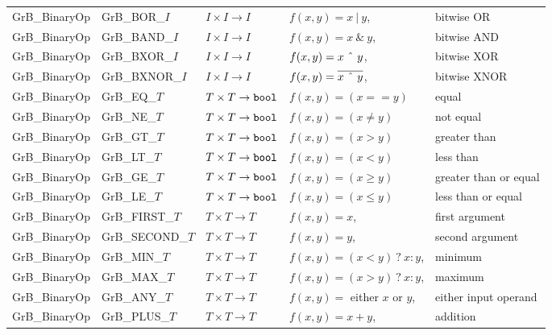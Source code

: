 \begin{table}
\begin{threeparttable}
\begin{tabular}{l|l|l|ll}
{\sf GrB\_BinaryOp}   & {\sf GrB\_BOR\_$I$}   & $I \times I \rightarrow I$ & $f(x,y) = x ~|~ y$, & bitwise OR \\
{\sf GrB\_BinaryOp}   & {\sf GrB\_BAND\_$I$}  & $I \times I \rightarrow I$ & $f(x,y) = x ~\&~ y$, & bitwise AND \\
{\sf GrB\_BinaryOp}   & {\sf GrB\_BXOR\_$I$}  & $I \times I \rightarrow I$ & $f(x,y) = x ~\mbox{\^{}}~ y$, & bitwise XOR \\
{\sf GrB\_BinaryOp}   & {\sf GrB\_BXNOR\_$I$} & $I \times I \rightarrow I$ & $f(x,y) = \overline{x ~\mbox{\^{}}~ y}$, & bitwise XNOR \\

{\sf GrB\_BinaryOp}   & {\sf GrB\_EQ\_$T$}    & $T \times T \rightarrow {\tt bool}$  & $f(x,y) = (x == y)$ & equal \\
{\sf GrB\_BinaryOp}   & {\sf GrB\_NE\_$T$}    & $T \times T \rightarrow {\tt bool}$  & $f(x,y) = (x \neq y)$ & not equal \\
{\sf GrB\_BinaryOp}   & {\sf GrB\_GT\_$T$}    & $T \times T \rightarrow {\tt bool}$  & $f(x,y) = (x > y)$ & greater than  \\
{\sf GrB\_BinaryOp}   & {\sf GrB\_LT\_$T$}    & $T \times T \rightarrow {\tt bool}$  & $f(x,y) = (x < y)$ & less than  \\
{\sf GrB\_BinaryOp}   & {\sf GrB\_GE\_$T$}    & $T \times T \rightarrow {\tt bool}$  & $f(x,y) = (x \geq y)$ & greater than or equal \\
{\sf GrB\_BinaryOp}   & {\sf GrB\_LE\_$T$}    & $T \times T \rightarrow {\tt bool}$  & $f(x,y) = (x \leq y)$ & less than or equal \\
{\sf GrB\_BinaryOp}   & {\sf GrB\_FIRST\_$T$} & $T \times T \rightarrow T$  & $f(x,y) = x$, & first argument \\
{\sf GrB\_BinaryOp}   & {\sf GrB\_SECOND\_$T$}& $T \times T \rightarrow T$  & $f(x,y) = y$, & second argument \\
{\sf GrB\_BinaryOp}   & {\sf GrB\_MIN\_$T$}   & $T \times T \rightarrow T$  & $f(x,y) = (x < y)~?~x : y$, & minimum \\
{\sf GrB\_BinaryOp}   & {\sf GrB\_MAX\_$T$}   & $T \times T \rightarrow T$  & $f(x,y) = (x > y)~?~x : y$, & maximum \\
{\sf GrB\_BinaryOp}   & {\sf GrB\_ANY\_$T$}   & $T \times T \rightarrow T$  & $f(x,y) = $ either $x$ or $y$, & either input operand\tnote{1} \\
{\sf GrB\_BinaryOp}   & {\sf GrB\_PLUS\_$T$}  & $T \times T \rightarrow T$  & $f(x,y) = x + y$, & addition \\

\end{tabular}
\end{threeparttable}
\end{table}
